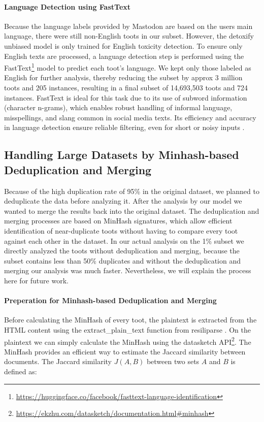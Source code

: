 \paragraph{Language Detection using FastText}\label{step:language-detection}
Because the language labels provided by Mastodon are based on the users main language, there were still non-English toots in our subset. However, the detoxify unbiased model is only trained for English toxicity detection. To ensure only English texts are processed, a language detection step is performed using the FastText\footnote{\url{https://huggingface.co/facebook/fasttext-language-identification}} model to predict each toot's language. We kept only those labeled as English for further analysis, thereby reducing the subset by approx 3 million toots and 205 instances, resulting in a final subset of 14,693,503 toots and 724 instances.
FastText is ideal for this task due to its use of subword information (character n-grams), which enables robust handling of informal language, misspellings, and slang common in social media texts. Its efficiency and accuracy in language detection ensure reliable filtering, even for short or noisy inputs \cite{joulin:2017}.

\subsection*{Handling Large Datasets by Minhash-based Deduplication and Merging}
Because of the high duplication rate of 95\% in the original dataset, we planned to deduplicate the data before analyzing it. After the analysis by our model we wanted to merge the results back into the original dataset. The deduplication and merging processes are based on MinHash signatures, which allow efficient identification of near-duplicate toots without having to compare every toot against each other in the dataset. In our actual analysis on the 1\% subset we directly analyzed the toots without deduplication and merging, because the subset contains less than 50\% duplicates and without the deduplication and merging our analysis was much faster. Nevertheless, we will explain the process here for future work.

\paragraph{Preperation for Minhash-based Deduplication and Merging}\label{step:preprocess} 
Before calculating the MinHash of every toot, the plaintext is extracted from the HTML content using the extract\_plain\_text function from resiliparse \cite{bevendorff:2018}. On the plaintext we can simply calculate the MinHash using the datasketch API\footnote{\url{https://ekzhu.com/datasketch/documentation.html\#minhash}}. The MinHash provides an efficient way to estimate the Jaccard similarity between documents. The Jaccard similarity $J(A,B)$ between two sets $A$ and $B$ is defined as:

